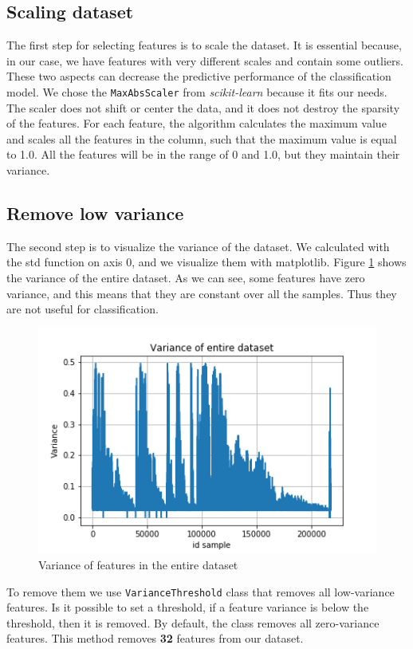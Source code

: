 \subsection{Scaling dataset}
The first step for selecting features is to scale the dataset. It is essential because, in our case, we have features with very different scales and contain some outliers. These two aspects can decrease the predictive performance of the classification model. We chose the \texttt{MaxAbsScaler} from \textit{scikit-learn} because it fits our needs. The scaler does not shift or center the data, and it does not destroy the sparsity of the features. For each feature, the algorithm calculates the maximum value and scales all the features in the column, such that the maximum value is equal to 1.0. All the features will be in the range of 0 and 1.0, but they maintain their variance.

\subsection{Remove low variance}
The second step is to visualize the variance of the dataset. We calculated with the std function on axis 0, and we visualize them with matplotlib. Figure \ref{fig:var_all} shows the variance of the entire dataset. As we can see, some features have zero variance, and this means that they are constant over all the samples. Thus they are not useful for classification.

\begin{figure}[!h]
	\centering
	\includegraphics[width=0.6\columnwidth]{variance-all.png}
	\caption{Variance of features in the entire dataset}
	\label{fig:var_all}
\end{figure}

To remove them we use \texttt{VarianceThreshold} class that removes all low-variance features. Is it possible to set a threshold, if a feature variance is below the threshold, then it is removed. By default, the class removes all zero-variance features. This method removes \textbf{32} features from our dataset.

